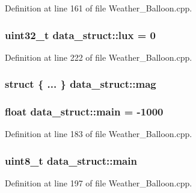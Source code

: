 Definition at line 161 of file Weather\+\_\+\+Balloon.\+cpp.

\subsubsection[{\texorpdfstring{lux}{lux}}]{\setlength{\rightskip}{0pt plus 5cm}uint32\+\_\+t data\+\_\+struct\+::lux = 0}\hypertarget{structdata__struct_ae4d58436614c3a53290c15fb4b1c6a54}{}\label{structdata__struct_ae4d58436614c3a53290c15fb4b1c6a54}


Definition at line 222 of file Weather\+\_\+\+Balloon.\+cpp.

\subsubsection[{\texorpdfstring{mag}{mag}}]{\setlength{\rightskip}{0pt plus 5cm}struct \{ ... \}   data\+\_\+struct\+::mag}\hypertarget{structdata__struct_a30a07c1e9b8dbcf4f0bffcc7bc5794fe}{}\label{structdata__struct_a30a07c1e9b8dbcf4f0bffcc7bc5794fe}
\subsubsection[{\texorpdfstring{main}{main}}]{\setlength{\rightskip}{0pt plus 5cm}float data\+\_\+struct\+::main = -\/1000}\hypertarget{structdata__struct_ab309ac348ad5259d5c611df96aebfdbe}{}\label{structdata__struct_ab309ac348ad5259d5c611df96aebfdbe}


Definition at line 183 of file Weather\+\_\+\+Balloon.\+cpp.

\subsubsection[{\texorpdfstring{main}{main}}]{\setlength{\rightskip}{0pt plus 5cm}uint8\+\_\+t data\+\_\+struct\+::main}\hypertarget{structdata__struct_adfb6db8ec836ac9197fc9486dbb1ab71}{}\label{structdata__struct_adfb6db8ec836ac9197fc9486dbb1ab71}


Definition at line 197 of file Weather\+\_\+\+Balloon.\+cpp.

